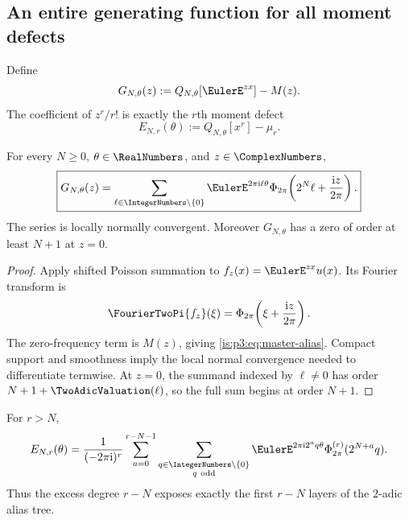 \subsection{An entire generating function for all moment defects}

Define
\begin{equation}
 G_{N,\theta}(z)
 :=Q_{N,\theta}[\EulerE^{zx}]-M(z).
 \label{is:p3:eq:G-def}
\end{equation}
The coefficient of $z^r/r!$ is exactly the $r$th moment defect
\begin{equation}
 E_{N,r}(\theta)
 :=Q_{N,\theta}[x^r]-\mu_r.
 \label{is:p3:eq:ENr-def}
\end{equation}

\begin{theorem}
\label{is:p3:thm:master-alias}
For every $N\ge0$, $\theta\in\RealNumbers$, and $z\in\ComplexNumbers$,
\begin{equation}
 \boxed{\displaystyle
 G_{N,\theta}(z)
 =\sum_{\ell\in\IntegerNumbers\setminus\{0\}}
 \EulerE^{2\pi\iu\ell\theta}
 \PhiCyc\!\left(2^N\ell+\frac{\iu z}{2\pi}\right).}
 \label{is:p3:eq:master-alias}
\end{equation}
The series is locally normally convergent.  Moreover $G_{N,\theta}$ has a zero of order at least $N+1$ at $z=0$.
\end{theorem}

\begin{proof}
Apply shifted Poisson summation to $f_z(x)=\EulerE^{zx}u(x)$.  Its Fourier transform is
\[
 \FourierTwoPi{f_z}(\xi)
 =\PhiCyc\!\left(\xi+\frac{\iu z}{2\pi}\right).
\]
The zero-frequency term is $M(z)$, giving \eqref{is:p3:eq:master-alias}.  Compact support and smoothness imply the local normal convergence needed to differentiate termwise.  At $z=0$, the summand indexed by $\ell\ne0$ has order
$N+1+\TwoAdicValuation(\ell)$, so the full sum begins at order $N+1$.
\end{proof}

\begin{corollary}
\label{is:p3:cor:valuation-filtration}
For $r>N$,
\begin{equation}
 E_{N,r}(\theta)
 =\frac1{(-2\pi\iu)^r}
 \sum_{a=0}^{r-N-1}
 \sum_{\substack{q\in\IntegerNumbers\setminus\{0\}\\q\ \mathrm{odd}}}
 \EulerE^{2\pi\iu 2^aq\theta}
 \PhiCyc^{(r)}(2^{N+a}q).
 \label{is:p3:eq:valuation-filtration}
\end{equation}
Thus the excess degree $r-N$ exposes exactly the first $r-N$ layers of the $2$-adic alias tree.
\end{corollary}

